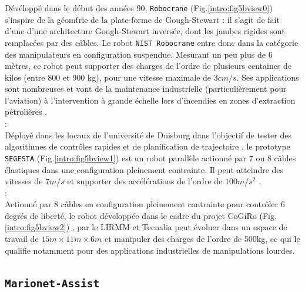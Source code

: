 D\'ev\'elopp\'e dans le d\'ebut des ann\'ees 90, {\tt Robocrane} 
\cite{journals/jfr/AlbusBD93} (Fig.\ref{intro:fig5bview0}) s'inspire de la 
g\'eom\'trie de la plate-forme de Gough-Stewart : il s'agit de fait d'une d'une 
architecture Gough-Stewart invers\'ee, dont les jambes rigides sont remplac\'ees 
par des c\^ables. Le robot {\tt NIST Robocrane} entre donc dans la 
cat\'egorie des manipulateurs en configuration suspendue. Mesurant un peu 
plus de 6 m\`etres, ce robot peut supporter des charges de l'ordre de plusieurs 
centaines de kilos (entre 800 et 900 kg), pour une vitesse maximale de $3cm/s$. 
Ses applications sont nombreuses et vont de la maintenance industrielle 
(particuli\`erement pour l'aviation) \`a l'intervention à grande \'echelle lors 
d'incendies en zones d'extraction p\'etrolières 
\cite{bostelman1994}\cite{bostelman1997emma}. \\

 :\\

D\'eploy\'e dans les locaux de l'universit\'e de Duisburg dans l'objectif de 
tester des algorithmes de contr\^oles rapides et de planification de 
trajectoire \cite{hiller2005}, le prototype {\tt SEGESTA} 
(Fig.\ref{intro:fig5bview1}) est un robot parall\`ele actionn\'e par 7 
ou 8 c\^ables \'elastiques dans une configuration pleinement contrainte. Il 
peut atteindre des vitesses de $7m/s$ et supporter des acc\'el\'erations de 
l'ordre de $100m/s^2$ \cite{bruckmann2006modular}. \\

 :\\

Actionn\'e par 8 c\^ables en configuration pleinement contrainte pour 
contr\^oler 6 degr\'es de libert\'e, le robot d\'evelopp\'ee dans le cadre du 
projet CoGiRo (Fig.\ref{intro:fig5bview2}) \cite{alexandre2012}, 
\cite{dallej2012} par le LIRMM et Tecnalia peut \'evoluer dans 
un espace de travail de $15m \times 11m \times 6m$ et manipuler des charges de 
l'ordre de 500kg, ce qui le qualifie notamment pour des applications 
industrielles de manipulations lourdes. \\


\subsection{{\tt Marionet-Assist}} \label{chap0-1-1}

